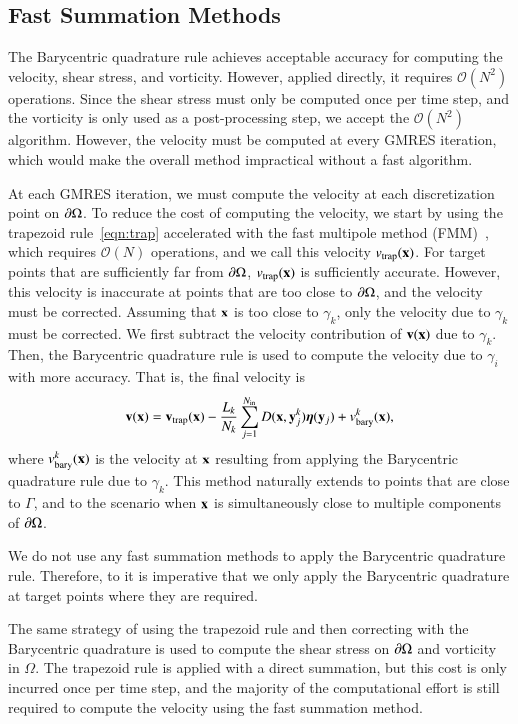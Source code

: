 \documentclass[preprint, 10pt]{elsarticle}
\begin{document}
\subsection{Fast Summation Methods}
\label{sec:fmm}
The Barycentric quadrature rule achieves acceptable accuracy for
computing the velocity, shear stress, and vorticity.  However, applied
directly, it requires $\mathcal{O}(N^2)$ operations.  Since the shear
stress must only be computed once per time step, and the vorticity is
only used as a post-processing step, we accept the $\mathcal{O}(N^2)$
algorithm.  However, the velocity must be computed at every GMRES
iteration, which would make the overall method impractical without a
fast algorithm.

At each GMRES iteration, we must compute the velocity at each
discretization point on ${\partial}\Omega$.  To reduce the cost of computing
the velocity, we start by using the trapezoid rule~\eqref{eqn:trap}
accelerated with the fast multipole method (FMM)~\cite{gre-rok1987},
which requires $\mathcal{O}(N)$ operations, and we call this velocity
$v_{\mathrm{trap}}({\mathbf{x}})$.  For target points that are sufficiently far from
${\partial}\Omega$, $v_{\mathrm{trap}}({\mathbf{x}})$ is sufficiently accurate.  However, this
velocity is inaccurate at points that are too close to ${\partial}\Omega$, and
the velocity must be corrected.  Assuming that ${\mathbf{x}}$ is too close to
$\gamma_k$, only the velocity due to $\gamma_k$ must be corrected. We
first subtract the velocity contribution of ${\mathbf{v}}({\mathbf{x}})$ due to
$\gamma_k$.  Then, the Barycentric quadrature rule is used to compute
the velocity due to $\gamma_i$ with more accuracy.  That is, the
final velocity is
\begin{align}
  {\mathbf{v}}({\mathbf{x}}) = {\mathbf{v}}_{\mathrm{trap}}({\mathbf{x}}) - \frac{L_k}{N_k} \sum_{j=1}^{N_{\mathrm{in}}} 
    D({\mathbf{x}},{\mathbf{y}}^k_j) {\boldsymbol\eta}({\mathbf{y}}_j) + v^k_{\mathrm{bary}}({\mathbf{x}}),
\end{align}
where $v^k_{\mathrm{bary}}({\mathbf{x}})$ is the velocity at ${\mathbf{x}}$ resulting from applying
the Barycentric quadrature rule due to $\gamma_k$.  This method
naturally extends to points that are close to $\Gamma$, and to the
scenario when ${\mathbf{x}}$ is simultaneously close to multiple components of
${\partial}\Omega$.

We do not use any fast summation methods to apply the Barycentric
quadrature rule.  Therefore, to it is imperative that we only apply
the Barycentric quadrature at target points where they are required.


The same strategy of using the trapezoid rule and then correcting with
the Barycentric quadrature is used to compute the shear stress on
${\partial}\Omega$ and vorticity in $\Omega$.  The trapezoid rule is applied
with a direct summation, but this cost is only incurred once per time
step, and the majority of the computational effort is still required to
compute the velocity using the fast summation method.
\end{document}
